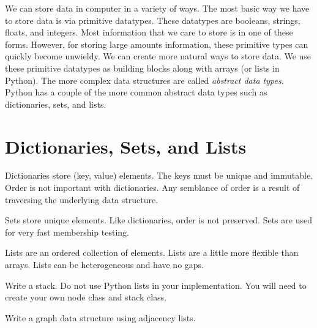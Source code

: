 \label{lab:Python_DataStructures}

We can store data in computer in a variety of ways.
The most basic way we have to store data is via primitive datatypes.
These datatypes are booleans, strings, floats, and integers.
Most information that we care to store is in one of these forms.
However, for storing large amounts information, these primitive types can quickly become unwieldy.
We can create more natural ways to store data.  We use these primitive datatypes as building blocks along with arrays (or lists in Python).  The more complex data structures are called \emph{abstract data types}.
Python has a couple of the more common abstract data types such as dictionaries, sets, and lists.

\section{Dictionaries, Sets, and Lists}
Dictionaries store (key, value) elements.  The keys must be unique and immutable.  Order is not important with dictionaries.  Any semblance of order is a result of traversing the underlying data structure.

Sets store unique elements.  Like dictionaries, order is not preserved.  Sets are used for very fast membership testing.

Lists are an ordered collection of elements.  Lists are a little more flexible than arrays.  Lists can be heterogeneous and have no gaps.  


\begin{problem}
Write a stack.  Do not use Python lists in your implementation.
You will need to create your own node class and stack class.
\end{problem}

\begin{problem}
Write a graph data structure using adjacency lists.
\end{problem}